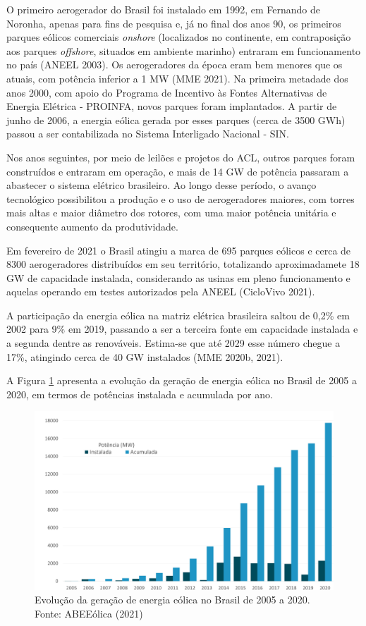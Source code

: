 \documentclass[
  oneside]{scrbook}
\begin{document}
O primeiro aerogerador do Brasil foi instalado em 1992, em Fernando de Noronha, apenas para fins de pesquisa e, já no final dos anos 90, os primeiros parques eólicos comerciais \emph{onshore} (localizados no continente, em contraposição aos parques \emph{offshore}, situados em ambiente marinho) entraram em funcionamento no país (ANEEL 2003). Os aerogeradores da época eram bem menores que os atuais, com potência inferior a 1 MW (MME 2021). Na primeira metadade dos anos 2000, com apoio do Programa de Incentivo às Fontes Alternativas de Energia Elétrica - PROINFA, novos parques foram implantados. A partir de junho de 2006, a energia eólica gerada por esses parques (cerca de 3500 GWh) passou a ser contabilizada no Sistema Interligado Nacional - SIN.

Nos anos seguintes, por meio de leilões e projetos do ACL, outros parques foram construídos e entraram em operação, e mais de 14 GW de potência passaram a abastecer o sistema elétrico brasileiro. Ao longo desse período, o avanço tecnológico possibilitou a produção e o uso de aerogeradores maiores, com torres mais altas e maior diâmetro dos rotores, com uma maior potência unitária e consequente aumento da produtividade.

Em fevereiro de 2021 o Brasil atingiu a marca de 695 parques eólicos e cerca de 8300 aerogeradores distribuídos em seu território, totalizando aproximadamete 18 GW de capacidade instalada, considerando as usinas em pleno funcionamento e aquelas operando em testes autorizados pela ANEEL (CicloVivo 2021).

A participação da energia eólica na matriz elétrica brasileira saltou de 0,2\% em 2002 para 9\% em 2019, passando a ser a terceira fonte em capacidade instalada e a segunda dentre as renováveis. Estima-se que até 2029 esse número chegue a 17\%, atingindo cerca de 40 GW instalados (MME 2020b, 2021).

A Figura \ref{fig:03} apresenta a evolução da geração de energia eólica no Brasil de 2005 a 2020, em termos de potências instalada e acumulada por ano.

\begin{figure}[H]

{\centering \includegraphics[width=0.8\linewidth]{imagens/cap01/Figura_1.3} 

}

\caption{Evolução da geração de energia eólica no Brasil de 2005 a 2020. Fonte: ABEEólica (2021)}\label{fig:03}
\end{figure}
\end{document}
